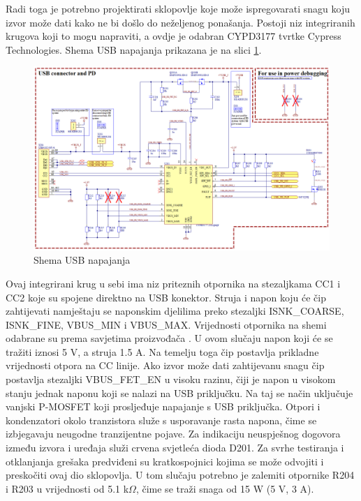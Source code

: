 Radi toga je potrebno projektirati sklopovlje koje može ispregovarati snagu koju izvor može dati kako ne bi došlo do neželjenog ponašanja. Postoji niz integriranih krugova koji to mogu napraviti, a ovdje je odabran CYPD3177 tvrtke Cypress Technologies. Shema USB napajanja prikazana je na slici \ref{slk:MB_USB}.
\begin{figure}
    \centering
    \includegraphics[width=1\textwidth]{Figures/MB_USB.png}
    \caption{Shema USB napajanja}
    \label{slk:MB_USB}
\end{figure}
Ovaj integrirani krug u sebi ima niz priteznih otpornika na stezaljkama CC1 i CC2 koje su spojene direktno na USB konektor. Struja i napon koju će čip zahtijevati namještaju se naponskim djelilima preko stezaljki ISNK\_COARSE, ISNK\_FINE, VBUS\_MIN i VBUS\_MAX. Vrijednosti otpornika na shemi odabrane su prema savjetima proizvođača \cite{ct:usb}. U ovom slučaju napon koji će se tražiti iznosi 5 V, a struja 1.5 A. Na temelju toga čip postavlja prikladne vrijednosti otpora na CC linije. Ako izvor može dati zahtijevanu snagu čip postavlja stezaljki VBUS\_FET\_EN u visoku razinu, čiji je napon u visokom stanju jednak naponu koji se nalazi na USB priključku. Na taj se način uključuje vanjski P-MOSFET koji prosljeđuje napajanje s USB priključka. Otpori i kondenzatori okolo tranzistora služe s usporavanje rasta napona, čime se izbjegavaju neugodne tranzijentne pojave. Za indikaciju neuspješnog dogovora između izvora i uređaja služi crvena svjetleća dioda D201. Za svrhe testiranja i otklanjanja grešaka predviđeni su kratkospojnici kojima se može odvojiti i preskočiti ovaj dio sklopovlja. U tom slučaju potrebno je zalemiti otpornike R204 i R203 u vrijednosti od 5.1 k$\Omega$, čime se traži snaga od 15 W (5 V, 3 A).